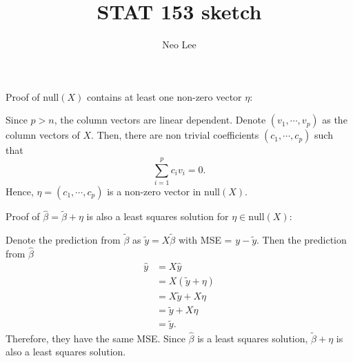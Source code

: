 \documentclass{article}
\title{STAT 153 sketch}
\author{Neo Lee}
\date{}
\begin{document}
 

\maketitle 

Proof of null$(X)$ contains at least one non-zero vector $\eta$:

Since $p>n$, the column vectors are linear dependent. Denote $(v_1, \cdots, v_p)$ as the column 
vectors of $X$. Then, there are non trivial coefficients $(c_1, \cdots, c_p)$ such that
$$\sum_{i=1}^{p}c_iv_i=0.$$
Hence, $\eta = (c_1,\cdots, c_p)$ is a non-zero vector in null$(X)$.

Proof of $\hat{\beta}=\tilde{\beta}+\eta$ is also a least squares solution for $\eta\in 
\mathrm{null}(X)$:

Denote the prediction from $\tilde{\beta}$ as $\tilde{y} = X\tilde{\beta}$ with MSE = $y-\tilde{y}$. 
Then the prediction from $\hat{\beta}$
\begin{align}
    \hat{y} & = X\hat{y} \\
    & = X(\tilde{y}+\eta) \\
    & = X\tilde{y}+X\eta \\
    & = \tilde{y}+X\eta \\
    & = \tilde{y}.
\end{align}
Therefore, they have the same MSE. Since $\hat{\beta}$ is a least squares solution, $\tilde{\beta}+
\eta$ is also a least squares solution.
\end{document}
